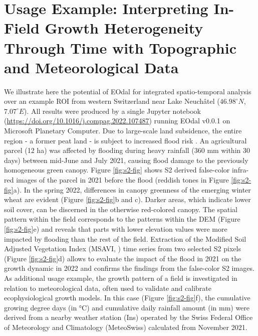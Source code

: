 \section{Usage Example: Interpreting In-Field Growth Heterogeneity Through Time with Topographic and Meteorological Data}
\label{sec:reprod_example}
We illustrate here the potential of EOdal for integrated spatio-temporal analysis over an example ROI from western Switzerland near Lake Neuchâtel ($46.98^\circ N$, $7.07^\circ E$). All results were produced by a single Jupyter notebook (\url{https://doi.org/10.1016/j.compag.2022.107487}) running \gls{EOdal} v0.0.1 on Microsoft Planetary Computer. Due to large-scale land subsidence, the entire region - a former peat land - is subject to increased flood risk \citep{egli_landschaftsdynamik_2020}. An agricultural parcel (12 ha) was affected by flooding during heavy rainfall (360 mm within 30 days) between mid-June and July 2021, causing flood damage to the previously homogeneous green canopy. Figure \ref{fig:s2-fig} shows \gls{S2} derived false-color infra-red images of the parcel in 2021 before the flood (reddish tones in Figure \ref{fig:s2-fig}a). In the spring 2022, differences in canopy greenness of the emerging winter wheat are evident (Figure \ref{fig:s2-fig}b and c). Darker areas, which indicate lower soil cover, can be discerned in the otherwise red-colored canopy. The spatial pattern within the field corresponds to the patterns within the DEM (Figure \ref{fig:s2-fig}e) and reveals that parts with lower elevation values were more impacted by flooding than the rest of the field. Extraction of the Modified Soil Adjusted Vegetation Index (MSAVI, \cite{qi_modified_1994}) time series from two selected S2 pixels (Figure \ref{fig:s2-fig}d) allows to evaluate the impact of the flood in 2021 on the growth dynamic in 2022 and confirms the findings from the false-color S2 images.
As additional usage example, the growth pattern of a field is investigated in relation to meteorological data, often used to validate and calibrate ecophysiological growth models. In this case (Figure \ref{fig:s2-fig}f), the cumulative growing degree days (in °C) and cumulative daily rainfall amount (in mm) were derived from a nearby weather station (Ins) operated by the Swiss Federal Office of Meteorology and Climatology (MeteoSwiss) calculated from November  2021.


